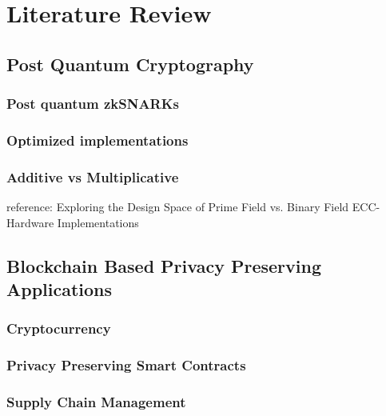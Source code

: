 \chapter{Literature Review}

\section{Post Quantum Cryptography}

\subsection{Post quantum zkSNARKs}

\subsection{Optimized implementations}

\subsection{Additive vs Multiplicative}
reference: Exploring the Design Space of Prime Field vs. Binary Field ECC-Hardware Implementations 





\section{Blockchain Based Privacy Preserving Applications}

\subsection{Cryptocurrency}

\subsection{Privacy Preserving Smart Contracts}

\subsection{Supply Chain Management}




